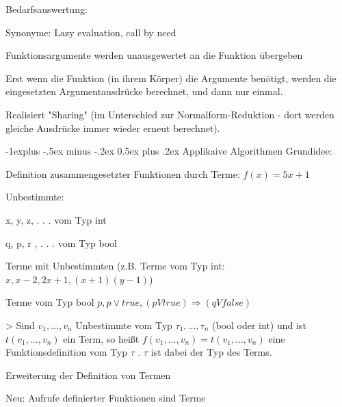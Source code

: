 \documentclass[10pt]{article}
\makeatletter
\renewcommand{\subsection}{\@startsection{subsection}{2}{0mm}%
                                {-1explus -.5ex minus -.2ex}%
                                {0.5ex plus .2ex}%
                                {\normalfont\normalsize\bfseries}}
\makeatother
\begin{document}
\begin{itemize*}
\begin{itemize*}
\begin{itemize*}
    \end{itemize*}
    \item Bedarfsauswertung:
    \begin{itemize*}
      \item Synonyme: Lazy evaluation, call by need
      \item Funktionsargumente werden unausgewertet an die Funktion übergeben
      \item Erst wenn die Funktion (in ihrem Körper) die Argumente benötigt, werden die eingesetzten Argumentausdrücke berechnet, und dann nur einmal.
      \item Realisiert "Sharing" (im Unterschied zur Normalform-Reduktion - dort werden gleiche Ausdrücke immer wieder erneut berechnet).
    \end{itemize*}
  \end{itemize*}
\end{itemize*}

\subsection{Applikaive Algorithmen}
Grundidee:
\begin{itemize*}
  \item Definition zusammengesetzter Funktionen durch Terme: $f(x) = 5x + 1$
  \item Unbestimmte:
  \begin{itemize*}
    \item x, y, z, . . . vom Typ int
    \item q, p, r , . . . vom Typ bool
  \end{itemize*}
  \item Terme mit Unbestimmten (z.B. Terme vom Typ int: $x, x - 2, 2x + 1, (x + 1)(y - 1)$)
  \item Terme vom Typ bool $p, p \vee true, (p V true) \Rightarrow (q V false)$
\end{itemize*}

> Sind $v_1, ..., v_n$ Unbestimmte vom Typ $\tau_1,...,\tau_n$ (bool oder int) und ist $t(v_1, ..., v_n)$ ein Term, so heißt $f(v_1, ..., v_n) = t(v_1, ..., v_n)$ eine Funktionsdefinition vom Typ $\tau$ . $\tau$ ist dabei der Typ des Terms.

\begin{itemize*}
  \item Erweiterung der Definition von Termen
  \item Neu: Aufrufe definierter Funktionen sind Terme
\end{itemize*}
\end{document}
